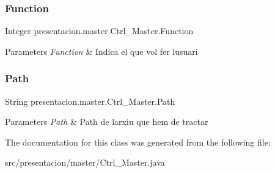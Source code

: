 \subsubsection{\texorpdfstring{Function}{Function}}
{\footnotesize\ttfamily Integer presentacion.\+master.\+Ctrl\+\_\+\+Master.\+Function\hspace{0.3cm}{\ttfamily [package]}}


\begin{DoxyParams}{Parameters}
{\em Function} & Indica el que vol fer l\textquotesingle{}usuari \\
\hline
\end{DoxyParams}
\mbox{\label{classpresentacion_1_1master_1_1Ctrl__Master_a3d2cb29ead7034fa79496fca2da0157a}} 
\subsubsection{\texorpdfstring{Path}{Path}}
{\footnotesize\ttfamily String presentacion.\+master.\+Ctrl\+\_\+\+Master.\+Path\hspace{0.3cm}{\ttfamily [package]}}


\begin{DoxyParams}{Parameters}
{\em Path} & Path de l\textquotesingle{}arxiu que hem de tractar \\
\hline
\end{DoxyParams}


The documentation for this class was generated from the following file\+:\begin{DoxyCompactItemize}
\item 
src/presentacion/master/Ctrl\+\_\+\+Master.\+java\end{DoxyCompactItemize}
